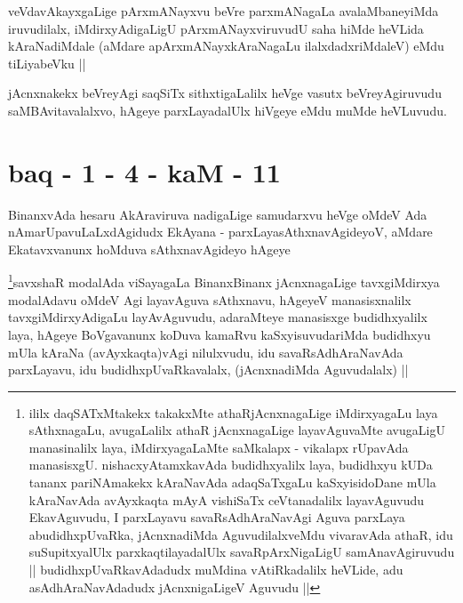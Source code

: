 \begin{artha}
veVdavAkayxgaLige pArxmANayxvu beVre parxmANagaLa avalaMbaneyiMda iruvudilalx, iMdirxyAdigaLigU pArxmANayxviruvudU saha hiMde heVLida kAraNadiMdale (aMdare apArxmANayxkAraNagaLu ilalxdadxriMdaleV) eMdu tiLiyabeVku ||
\end{artha}


\begin{artha}
jAcnxnakekx beVreyAgi saqSiTx sithxtigaLalilx heVge vasutx beVreyAgiruvudu saMBAvitavalalxvo, hAgeye parxLayadalUlx hiVgeye eMdu muMde heVLuvudu.
\end{artha}

\section*{baq - 1 - 4 - kaM - 11}

\begin{artha}
BinanxvAda hesaru AkAraviruva nadigaLige samudarxvu heVge oMdeV Ada nAmarUpavuLaLxdAgidudx EkAyana - parxLayasAthxnavAgideyoV, aMdare Ekatavxvanunx hoMduva sAthxnavAgideyo hAgeye
\end{artha}


\begin{artha}
\footnote[1]{ililx daqSATxMtakekx takakxMte athaRjAcnxnagaLige iMdirxyagaLu laya sAthxnagaLu, avugaLalilx athaR jAcnxnagaLige layavAguvaMte avugaLigU manasinalilx laya, iMdirxyagaLaMte saMkalapx - vikalapx rUpavAda manasisxgU. nishacxyAtamxkavAda budidhxyalilx laya, budidhxyu kUDa tananx pariNAmakekx kAraNavAda adaqSaTxgaLu kaSxyisidoDane mUla kAraNavAda avAyxkaqta mAyA vishiSaTx ceVtanadalilx layavAguvudu EkavAguvudu, I parxLayavu savaRsAdhAraNavAgi Aguva parxLaya abudidhxpUvaRka, jAcnxnadiMda AguvudilalxveMdu vivaravAda athaR, idu suSupitxyalUlx parxkaqtilayadalUlx savaRpArxNigaLigU samAnavAgiruvudu || budidhxpUvaRkavAdadudx muMdina vAtiRkadalilx heVLide, adu asAdhAraNavAdadudx jAcnxnigaLigeV Aguvudu ||}savxshaR modalAda viSayagaLa BinanxBinanx jAcnxnagaLige tavxgiMdirxya modalAdavu oMdeV Agi layavAguva sAthxnavu, hAgeyeV manasisxnalilx tavxgiMdirxyAdigaLu layAvAguvudu, adaraMteye manasisxge budidhxyalilx laya, hAgeye BoVgavanunx koDuva kamaRvu kaSxyisuvudariMda budidhxyu mUla kAraNa (avAyxkaqta)vAgi nilulxvudu, idu savaRsAdhAraNavAda parxLayavu, idu budidhxpUvaRkavalalx, (jAcnxnadiMda Aguvudalalx) ||
\end{artha}

